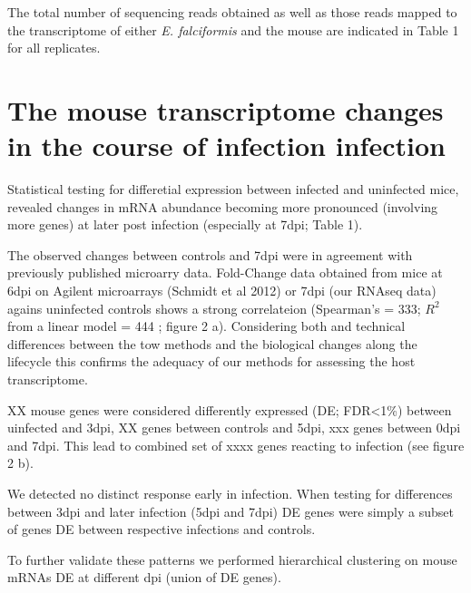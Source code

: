 \documentclass{bmcart}
\begin{document}
The total number of sequencing reads obtained as well as those reads
mapped to the transcriptome of either \textit{E. falciformis} and the
mouse are indicated in Table 1 for all replicates.

\section*{The mouse transcriptome changes in the course of infection infection}

Statistical testing for differetial expression between infected and
uninfected mice, revealed changes in mRNA abundance becoming more
pronounced (involving more genes) at later post infection (especially
at 7dpi; Table 1).

The observed changes between controls and 7dpi were in agreement with
previously published microarry data. Fold-Change data obtained from
mice at 6dpi on Agilent microarrays (Schmidt et al 2012) or 7dpi (our
RNAseq data) agains uninfected controls shows a strong correlateion
(Spearman's \rho = 333; $R^2$ from a linear model = 444 ; figure 2
a). Considering both and technical differences between the tow methods
and the biological changes along the lifecycle this confirms the
adequacy of our methods for assessing the host transcriptome.

XX mouse genes were considered differently expressed (DE; FDR<1\%)
between uinfected and 3dpi, XX genes between controls and 5dpi, xxx
genes between 0dpi and 7dpi. This lead to combined set of xxxx genes
reacting to infection (see figure 2 b).


We detected no distinct response early in infection.  When testing for
differences between 3dpi and later infection (5dpi and 7dpi) DE genes
were simply a subset of genes DE between respective infections and
controls.

To further validate these patterns we performed hierarchical
clustering on mouse mRNAs DE at different dpi (union of DE
genes).


\end{document}
